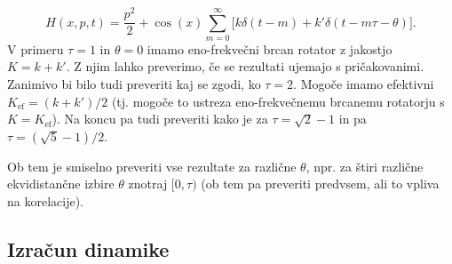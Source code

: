 \documentclass[a4paper, 12pt]{article}
\begin{document}
\begin{equation}
	H(x,p,t) = \frac{p^2}{2} + \cos(x)\sum_{m = 0}^{\infty}\Big[k\delta(t - m) + k'\delta(t - m\tau - \theta)\Big].
\end{equation}
V primeru $\tau = 1$ in $\theta = 0$ imamo eno-frekve\v cni brcan rotator z jakostjo $K = k + k'$. Z njim lahko preverimo,
\v ce se rezultati ujemajo s pri\v cakovanimi. Zanimivo bi bilo tudi preveriti kaj se zgodi, ko $\tau = 2$. Mogo\v ce
imamo efektivni $K_\text{ef} = (k + k')/2$ (tj. mogo\v ce to ustreza eno-frekve\v cnemu brcanemu rotatorju s
$K = K_\text{ef}$). Na koncu pa tudi preveriti kako je za $\tau = \sqrt{2}-1$ in pa $\tau = (\sqrt{5} - 1)/2$.

Ob tem je smiselno preveriti vse rezultate za razli\v cne $\theta$, npr. za \v stiri razli\v cne ekvidistan\v cne izbire
$\theta$ znotraj $[0,\tau)$ (ob tem pa preveriti predvsem, ali to vpliva na korelacije).

\subsection{Izra\v cun dinamike}
\end{document}
